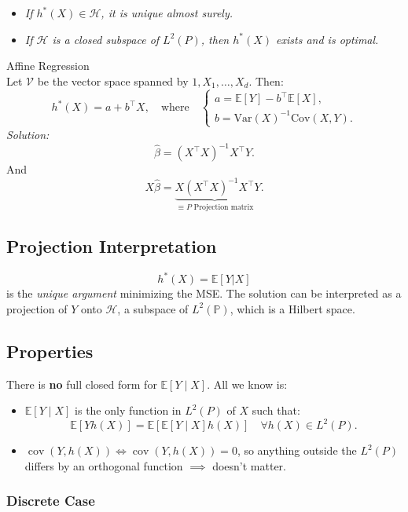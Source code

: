 \begin{thm}{}
\begin{itemize}
    \item \textit{If $h^*(X) \in \mathscr{H}$, it is unique almost surely.}
    \item \textit{If $\mathscr{H}$ is a closed subspace of $L^2(P)$, then $h^*(X)$ exists and is optimal.}
\end{itemize}	
\end{thm}


\begin{eg}{Affine Regression}\\
Let $\mathcal{V}$ be the vector space spanned by $1, X_1, \ldots, X_d$. Then:
\[
h^*(X) = a + b^\top X, \quad \text{where} \quad
\begin{cases}
    a = \mathbb{E}[Y] - b^\top \mathbb{E}[X], \\
    b = \text{Var}(X)^{-1} \text{Cov}(X, Y).
\end{cases}
\]
\textit{Solution:} 
\[
\hat{\beta} = (X^\top X)^{-1} X^\top Y.
\]
And 
\[
X\hat{\beta} = \underbrace{X(X^\top X)^{-1} X^\top}_{\equiv P \text{ Projection matrix}} Y.
\]
\end{eg}


\subsection*{Projection Interpretation}
\[
h^*(X) = \mathbb{E}[Y | X]
\]
is the \textit{unique argument} minimizing the MSE. The solution can be interpreted as a projection of $Y$ onto $\mathscr{H}$, a subspace of $L^2(\mathbb{P})$, which is a Hilbert space.

\subsection{Properties}
There is \textbf{no} full closed form for \(\mathbb{E}[Y \mid X]\). All we know is:
\begin{itemize}
    \item \(\mathbb{E}[Y \mid X]\) is the only function in \(L^2(P)\) of \(X\) such that:
    \[
    \mathbb{E}[Yh(X)] = \mathbb{E}[\mathbb{E}[Y \mid X]h(X)] \quad \forall h(X) \in L^2(P).
    \]
    \item \(\operatorname{cov}(Y, h(X)) \iff \operatorname{cov}(Y, h(X)) = 0\), so anything outside the \(L^2(P)\) differs by an orthogonal function \(\implies\) doesn't matter.
\end{itemize}


\subsubsection{Discrete Case}

